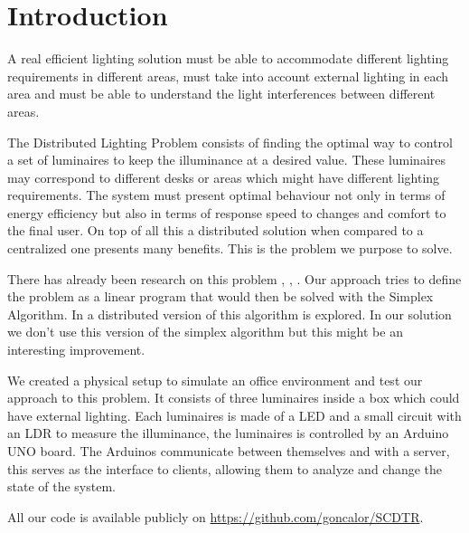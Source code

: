 \section{Introduction}

A real efficient lighting solution must be able to accommodate different lighting requirements in different areas, must take into account external lighting in each area and must be able to understand the light interferences between different areas.

The Distributed Lighting Problem consists of finding the optimal way to control a set of luminaires to keep the illuminance at a desired value. These luminaires may correspond to different desks or areas which might have different lighting requirements. The system must present optimal behaviour not only in terms of energy efficiency but also in terms of response speed to changes and comfort to the final user. On top of all this a distributed solution when compared to a centralized one presents many benefits. This is the problem we purpose to solve.

There has already been research on this problem \cite{caicedo2013distributed}, \cite{caicedo2011occupancy}, \cite{pandharipande2011daylight}. Our approach tries to define the problem as a linear program that would then be solved with the Simplex Algorithm. In \cite{DistributedSimplex} a distributed version of this algorithm is explored. In our solution we don't use this version of the simplex algorithm but this might be an interesting improvement.

We created a physical setup to simulate an office environment and test our approach to this problem. It consists of three luminaires inside a box which could have external lighting. Each luminaires is made of a LED and a small circuit with an LDR to measure the illuminance, the luminaires is controlled by an Arduino UNO board. The Arduinos communicate between themselves and with a server, this serves as the interface to clients, allowing them to analyze and change the state of the system.

All our code is available publicly on \url{https://github.com/goncalor/SCDTR}.
